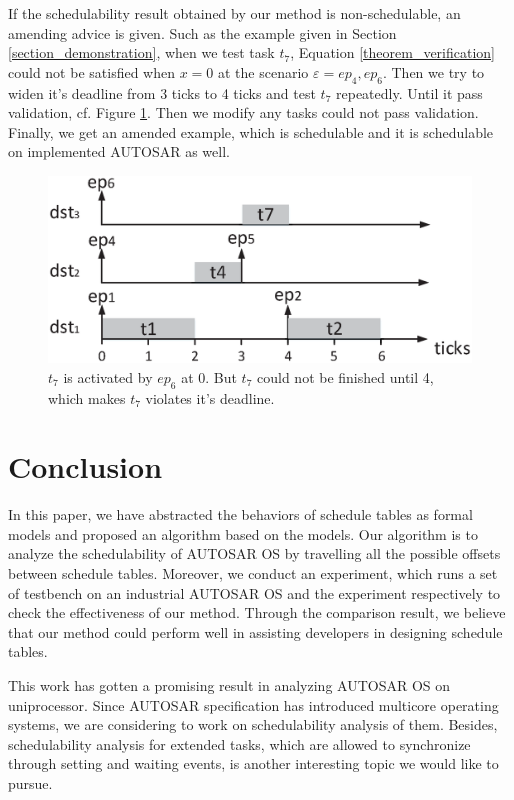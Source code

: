 \documentclass[sigconf]{acmart}
\begin{document}
If the schedulability result obtained by our method is non-schedulable, an amending advice is given. Such as the example given in Section \ref{section_demonstration}, when we test task $t_7$, Equation \ref{theorem_verification} could not be satisfied when $x=0$ at the scenario $\varepsilon={ep_4,ep_6}$. Then we try to widen it's deadline from 3 ticks to 4 ticks and test $t_7$ repeatedly. Until it pass validation, cf. Figure \ref{figure_widen}. Then we modify any tasks could not pass validation. Finally, we get an amended example, which is schedulable and it is schedulable on implemented AUTOSAR as well.

\begin{figure}
  \centering
  \includegraphics[scale=.45]{graphics/figure_widen.eps}
  \caption{$t_7$ is activated by $ep_6$ at 0. But $t_7$ could not be finished until 4, which makes $t_7$ violates it's deadline.}
  \label{figure_widen}
\end{figure}

\section{Conclusion}
In this paper, we have abstracted the behaviors of schedule tables as formal models and proposed an algorithm based on the models. Our algorithm is to analyze the schedulability of AUTOSAR OS by travelling all the possible offsets between schedule tables. Moreover, we conduct an experiment, which runs a set of testbench on an industrial AUTOSAR OS and the experiment respectively to check the effectiveness of our method. Through the comparison result, we believe that our method could perform well in assisting developers in designing schedule tables.
 
This work has gotten a promising result in analyzing AUTOSAR OS on uniprocessor. Since AUTOSAR specification has introduced multicore operating systems, we are considering to work on schedulability analysis of them. Besides, schedulability analysis for extended tasks, which are allowed to synchronize through setting and waiting events, is another interesting topic we would like to pursue.




\end{document}
